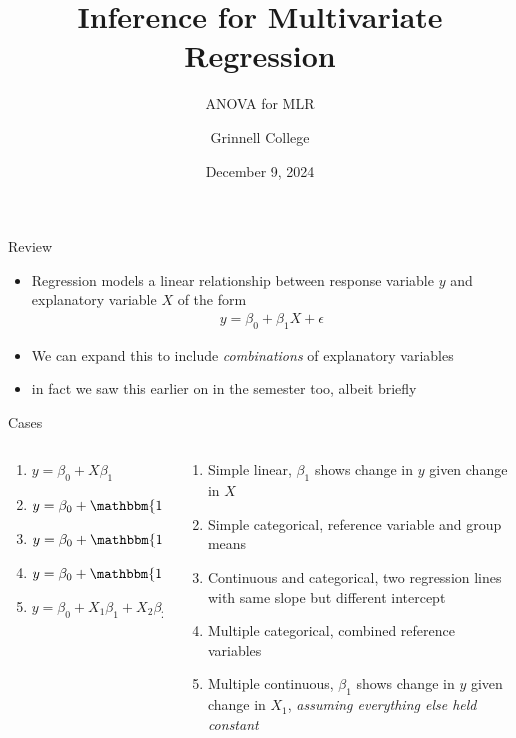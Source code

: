 \documentclass{beamer}
\title[STA-209]{Inference for Multivariate Regression}
\subtitle{ANOVA for MLR}
\author{Grinnell College}
\date{December 9, 2024}
\begin{document}
\begin{frame}
  \titlepage
\end{frame}

\begin{frame}{Review}

\begin{itemize}
\item Regression models a linear relationship between response variable $y$ and explanatory variable $X$ of the form
\begin{align*}
y = \beta_0 + \beta_1 X + \epsilon
\end{align*}
\item We can expand this to include \textit{combinations} of explanatory variables
\item in fact we saw this earlier on in the semester too, albeit briefly
\end{itemize}

\end{frame}


\begin{frame}{Cases}

\begin{columns}

  \begin{column}{0.4\textwidth}
\begin{enumerate}
\item $y = \beta_0 + X \beta_1$ \vspace{4mm}
\item $y = \beta_0 + \mathbbm{1}_A \beta_1 $ \vspace{4mm}
\item $y = \beta_0 + \mathbbm{1}_A \beta_1 + X \beta_2 $ \vspace{4mm}
\item $y = \beta_0 + \mathbbm{1}_A \beta_1 + \mathbbm{1}_B \beta_2 $ \vspace{4mm}
\item $y = \beta_0 + X_1 \beta_1 + X_2 \beta_2 $ \vspace{4mm}
\end{enumerate}
  \end{column}
  \begin{column}{0.5\textwidth}
\begin{enumerate}
\item Simple linear, $\beta_1$ shows change in  $y$ given change in $X$
\item Simple categorical, reference variable and group means
\item Continuous and categorical, two regression lines with same slope but different intercept
\item Multiple categorical, combined reference variables
\item Multiple continuous, $\beta_1$ shows change in $y$ given change in $X_1$, \textit{assuming everything else held constant}
\end{enumerate}
  \end{column}

\end{columns}
\end{frame}
\end{document}
